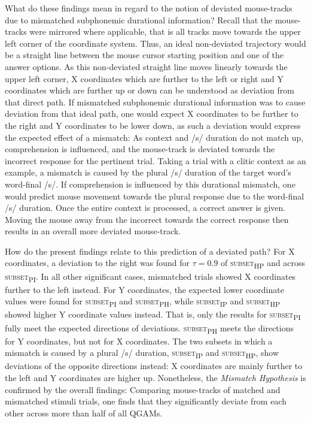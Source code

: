 What do these findings mean in regard to the notion of deviated mouse-tracks due to mismatched subphonemic durational information? Recall that the mouse-tracks were mirrored where applicable, that is all tracks move towards the upper left corner of the coordinate system. Thus, an ideal non-deviated trajectory would be a straight line between the mouse cursor starting position and one of the answer options. As this non-deviated straight line moves linearly towards the upper left corner, X coordinates which are further to the left or right and Y coordinates which are further up or down can be understood as deviation from that direct path. If mismatched subphonemic durational information was to cause deviation from that ideal path, one would expect X coordinates to be further to the right and Y coordinates to be lower down, as such a deviation would express the expected effect of a mismatch: As context and /s/ duration do not match up, comprehension is influenced, and the mouse-track is deviated towards the incorrect response for the pertinent trial. Taking a trial with a clitic context as an example, a mismatch is caused by the plural /s/ duration of the target word’s word-final /s/. If comprehension is influenced by this durational mismatch, one would predict mouse movement towards the plural response due to the word-final /s/ duration. Once the entire context is processed, a correct answer is given. Moving the mouse away from the incorrect towards the correct response then results in an overall more deviated mouse-track.

How do the present findings relate to this prediction of a deviated path? For X coordinates, a deviation to the right was found for $\tau=0.9$ of \textsc{subset\textsubscript{HP}} and across \textsc{subset\textsubscript{PI}}. In all other significant cases, mismatched trials showed X coordinates further to the left instead. For Y coordinates, the expected lower coordinate values were found for \textsc{subset\textsubscript{PI}} and \textsc{subset\textsubscript{PH}}, while \textsc{subset\textsubscript{IP}} and \textsc{subset\textsubscript{HP}} showed higher Y coordinate values instead. That is, only the results for \textsc{subset\textsubscript{PI}} fully meet the expected directions of deviations. \textsc{subset\textsubscript{PH}} meets the directions for Y coordinates, but not for X coordinates. The two subsets in which a mismatch is caused by a plural /s/ duration, \textsc{subset\textsubscript{IP}} and \textsc{subset\textsubscript{HP}}, show deviations of the opposite directions instead: X coordinates are mainly further to the left and Y coordinates are higher up. Nonetheless, the \textit{Mismatch Hypothesis} is confirmed by the overall findings: Comparing mouse-tracks of matched and mismatched stimuli trials, one finds that they significantly deviate from each other across more than half of all QGAMs. 


